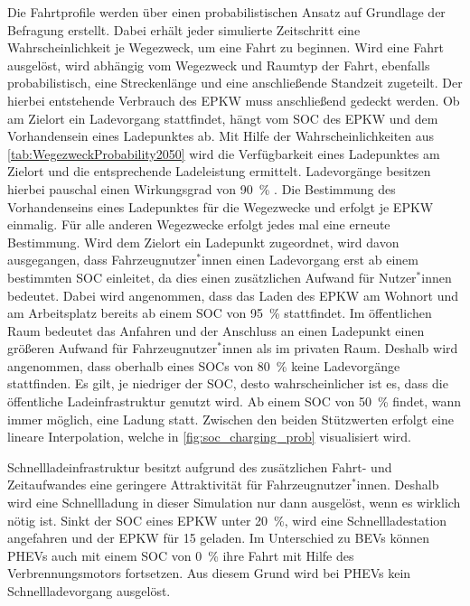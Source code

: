 Die Fahrtprofile werden über einen probabilistischen Ansatz auf Grundlage der Befragung  erstellt.
Dabei erhält jeder simulierte Zeitschritt eine Wahrscheinlichkeit je Wegezweck, um eine Fahrt zu beginnen.
Wird eine Fahrt ausgelöst, wird abhängig vom Wegezweck und Raumtyp der Fahrt, ebenfalls probabilistisch, eine Streckenlänge und eine anschließende Standzeit zugeteilt.
Der hierbei entstehende Verbrauch des \gls{EPKW} muss anschließend gedeckt werden.
Ob am Zielort ein Ladevorgang stattfindet, hängt vom \gls{SOC} des \gls{EPKW} und dem Vorhandensein eines Ladepunktes ab.
Mit Hilfe der Wahrscheinlichkeiten aus \autoref{tab:WegezweckProbability2050} wird die Verfügbarkeit eines Ladepunktes am Zielort und die entsprechende Ladeleistung ermittelt.
Ladevorgänge besitzen hierbei pauschal einen Wirkungsgrad von \SI{90}{\percent} \cite{EliaGroup2020}.
Die Bestimmung des Vorhandenseins eines Ladepunktes für die Wegezwecke \nH und \Arbeit erfolgt je \gls{EPKW} einmalig.
Für alle anderen Wegezwecke erfolgt jedes mal eine erneute Bestimmung.
Wird dem Zielort ein Ladepunkt zugeordnet, wird davon ausgegangen, dass Fahrzeugnutzer\(^*\)innen einen Ladevorgang erst ab einem bestimmten \gls{SOC} einleitet, da dies einen zusätzlichen Aufwand für Nutzer\(^*\)innen bedeutet.
Dabei wird angenommen, dass das Laden des \gls{EPKW} am Wohnort und am Arbeitsplatz bereits ab einem \gls{SOC} von \SI{95}{\percent} stattfindet.
Im öffentlichen Raum bedeutet das Anfahren und der Anschluss an einen Ladepunkt einen größeren Aufwand für Fahrzeugnutzer\(^*\)innen als im privaten Raum.
Deshalb wird angenommen, dass oberhalb eines \glspl{SOC} von \SI{80}{\percent} keine Ladevorgänge stattfinden.
Es gilt, je niedriger der \gls{SOC}, desto wahrscheinlicher ist es, dass die öffentliche Ladeinfrastruktur genutzt wird.
Ab einem \gls{SOC} von \SI{50}{\percent} findet, wann immer möglich, eine Ladung statt.
Zwischen den beiden Stützwerten erfolgt eine lineare Interpolation, welche in \autoref{fig:soc_charging_prob} visualisiert wird.



Schnellladeinfrastruktur besitzt aufgrund des zusätzlichen Fahrt- und Zeitaufwandes eine geringere Attraktivität für Fahrzeugnutzer\(^*\)innen.
Deshalb wird eine Schnellladung in dieser Simulation nur dann ausgelöst, wenn es wirklich nötig ist.
Sinkt der \gls{SOC} eines \gls{EPKW} unter \SI{20}{\percent}, wird eine Schnellladestation angefahren und der \gls{EPKW} für \SI{15}{\Minuten} geladen.
Im Unterschied zu \glspl{BEV} können \glspl{PHEV} auch mit einem \gls{SOC} von \SI{0}{\percent} ihre Fahrt mit Hilfe des Verbrennungsmotors fortsetzen.
Aus diesem Grund wird bei \glspl{PHEV} kein Schnellladevorgang ausgelöst.\medskip

